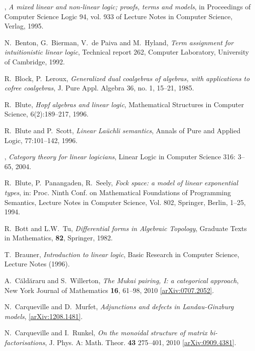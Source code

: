 \documentclass[english,letter paper,12pt,reqno]{article}
\theoremstyle{example}
\numberwithin{equation}{section}
\begin{document}
\begin{thebibliography}{BHLS03}
\bysame, \textsl{A mixed linear and non-linear logic; proofs, terms and models}, in Proceedings of Computer Science Logic 94, vol. 933 of Lecture Notes in Computer Science, Verlag, 1995.

N.~Benton, G.~Bierman, V.~de Paiva and M.~Hyland, \textsl{Term assignment for intuitionistic linear logic}, Technical report 262, Computer Laboratory, University of Cambridge, 1992.

R.~Block, P.~Leroux, \textsl{Generalized dual coalgebras of algebras, with applications to cofree coalgebras}, J. Pure Appl. Algebra 36, no. 1, 15--21, 1985.

R.~Blute, \textsl{Hopf algebras and linear logic}, Mathematical Structures in Computer Science, 6(2):189--217, 1996.

R.~Blute and P.~Scott, \textsl{Linear {L}a\"{u}chli semantics}, Annals of Pure and Applied Logic, 77:101--142, 1996.

\bysame, \textsl{Category theory for linear logicians}, Linear Logic in Computer Science 316: 3--65, 2004.

R.~Blute, P.~Panangaden, R.~Seely, \textsl{Fock space: a model of linear exponential types}, in: Proc. Ninth Conf. on Mathematical Foundations of Programming Semantics, Lecture Notes in Computer Science, Vol. 802, Springer, Berlin, 1--25, 1994.

R.~Bott and L.W.~Tu, \textsl{Differential forms in {A}lgebraic {T}opology}, Graduate Texts in Mathematics, \textbf{82}, Springer, 1982.

T.~Brauner, \textsl{Introduction to linear logic}, Basic Research in Computer Science, Lecture Notes (1996).

A.~{C\u ald\u araru} and S.~Willerton, \textsl{The Mukai pairing, I: a categorical approach},
New York Journal of Mathematics \textbf{16}, 61--98, 2010
  \href{http://arxiv.org/abs/0707.2052}{[arXiv:0707.2052]}.
  
N.~Carqueville and D.~Murfet, \textsl{Adjunctions and defects in {L}andau-{G}inzburg models}, \href{http://arxiv.org/abs/1208.1481}{[arXiv:1208.1481]}.

N.~Carqueville and I.~Runkel, \textsl{On the monoidal structure of matrix bi-factorisations}, J. Phys.
  A: Math. Theor. \textbf{43} 275--401, 2010
  \href{http://arxiv.org/abs/0909.4381}{[arXiv:0909.4381]}.


\end{thebibliography}
\end{document}
